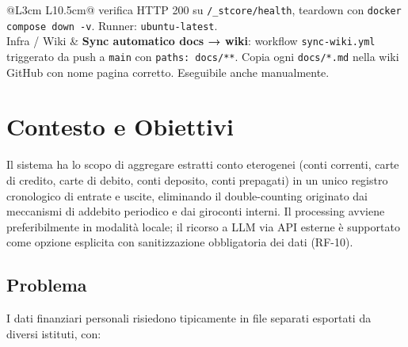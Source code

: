 \documentclass[11pt, a4paper]{article}
\begin{document}
\begin{center}
\begin{longtable}{@{}L{3cm} L{10.5cm}@{}}
                           verifica HTTP 200 su \texttt{/\_stcore/health}, teardown con
                           \texttt{docker compose down -v}. Runner: \texttt{ubuntu-latest}. \\[3pt]
Infra / Wiki            & \textbf{Sync automatico docs → wiki}: workflow
                           \texttt{sync-wiki.yml} triggerato da push a \texttt{main} con
                           \texttt{paths: docs/**}. Copia ogni \texttt{docs/*.md} nella wiki
                           GitHub con nome pagina corretto. Eseguibile anche manualmente. \\
\bottomrule
\end{longtable}
\end{center}

\tableofcontents
\newpage


\section{Contesto e Obiettivi}

Il sistema ha lo scopo di aggregare estratti conto eterogenei (conti correnti, carte di
credito, carte di debito, conti deposito, conti prepagati) in un unico registro
cronologico di entrate e uscite, eliminando il double-counting originato dai meccanismi
di addebito periodico e dai giroconti interni. Il processing avviene preferibilmente
in modalità locale; il ricorso a LLM via API esterne è supportato come opzione
esplicita con sanitizzazione obbligatoria dei dati (RF-10).

\subsection{Problema}

I dati finanziari personali risiedono tipicamente in file separati esportati da diversi
istituti, con:
\end{document}
